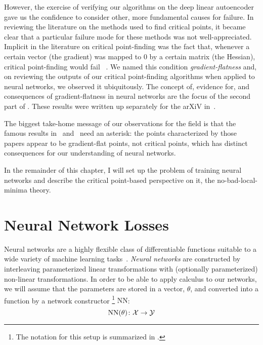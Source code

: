 \documentclass[../../thesis.tex]{subfiles}
\begin{document}
However, the exercise of verifying our algorithms on the deep linear autoencoder
gave us the confidence to consider other, more fundamental causes for failure.
In reviewing the literature on the methods used to find critical points,
it became clear that a particular failure mode for these methods
was not well-appreciated.
Implicit in the literature on critical point-finding was the fact that,
whenever a certain vector (the gradient)
was mapped to 0 by a certain matrix (the Hessian),
critical point-finding would fail%
~\cite{griewank1983,boyd2004,roosta2018}.
We named this condition \emph{gradient-flatness}
and, on reviewing the outputs of our critical point-finding algorithms
when applied to neural networks,
we observed it ubiquitously.
The concept of, evidence for, and consequences of gradient-flatness
in neural networks are the focus of the second part of .
These results were written up separately for the arXiV
in~\cite{frye2020}.

The biggest take-home message of our observations for the field
is that the famous results
in~\cite{dauphin2014} and~\cite{pennington2017}
need an asterisk:
the points characterized by those papers appear to be
gradient-flat points, not critical points,
which has distinct consequences for our understanding of neural networks.

In the remainder of this chapter,
I will set up the problem of training neural networks
and describe the critical point-based perspective on it,
the no-bad-local-minima theory.

\section{Neural Network Losses}

Neural networks are a highly flexible class of
differentiable functions
suitable to a wide variety of
machine learning tasks~\cite{lecun2015}.
\emph{Neural networks} are constructed by interleaving
parameterized linear transformations
with (optionally parameterized) non-linear transformations.
In order to be able to apply calculus
to our networks, we will assume that
the parameters are stored in a vector, $\theta$,
and converted into a function by a network constructor%
\footnote{%
The notation for this setup is summarized in .
}
$\mathrm{NN}$:
\begin{equation}
	\mathrm{NN}(\theta) \colon {\mathcal{X}} \to {\mathcal{Y}}
\end{equation}
\end{document}
